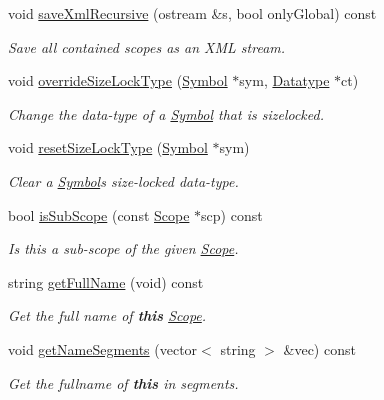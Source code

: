 \begin{DoxyCompactItemize}
void \mbox{\hyperlink{class_scope_a68c1f312cf9173871baa1b2fad29bb58}{save\+Xml\+Recursive}} (ostream \&s, bool only\+Global) const
\begin{DoxyCompactList}\small\item\em Save all contained scopes as an X\+ML stream. \end{DoxyCompactList}\item 
void \mbox{\hyperlink{class_scope_a0a05df4f8df1764859bec8372d64b1ee}{override\+Size\+Lock\+Type}} (\mbox{\hyperlink{class_symbol}{Symbol}} $\ast$sym, \mbox{\hyperlink{class_datatype}{Datatype}} $\ast$ct)
\begin{DoxyCompactList}\small\item\em Change the data-\/type of a \mbox{\hyperlink{class_symbol}{Symbol}} that is {\itshape sizelocked}. \end{DoxyCompactList}\item 
void \mbox{\hyperlink{class_scope_a4af52229967e3a507a5367e14a298142}{reset\+Size\+Lock\+Type}} (\mbox{\hyperlink{class_symbol}{Symbol}} $\ast$sym)
\begin{DoxyCompactList}\small\item\em Clear a \mbox{\hyperlink{class_symbol}{Symbol}}\textquotesingle{}s {\itshape size-\/locked} data-\/type. \end{DoxyCompactList}\item 
bool \mbox{\hyperlink{class_scope_a1abf50d101c65af19281910dac990ca5}{is\+Sub\+Scope}} (const \mbox{\hyperlink{class_scope}{Scope}} $\ast$scp) const
\begin{DoxyCompactList}\small\item\em Is this a sub-\/scope of the given \mbox{\hyperlink{class_scope}{Scope}}. \end{DoxyCompactList}\item 
string \mbox{\hyperlink{class_scope_a6e0c1eab94766936cb73686e39b2ab6d}{get\+Full\+Name}} (void) const
\begin{DoxyCompactList}\small\item\em Get the full name of {\bfseries{this}} \mbox{\hyperlink{class_scope}{Scope}}. \end{DoxyCompactList}\item 
void \mbox{\hyperlink{class_scope_a0d0befa1009748f0af39a1e6b7704b7b}{get\+Name\+Segments}} (vector$<$ string $>$ \&vec) const
\begin{DoxyCompactList}\small\item\em Get the fullname of {\bfseries{this}} in segments. \end{DoxyCompactList}\item 

\end{DoxyCompactItemize}
